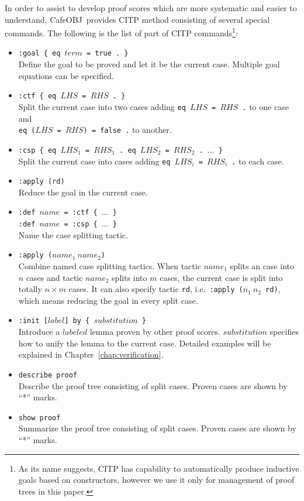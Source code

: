 \documentclass[12pt]{report}
\newcommand{\stt}[1]{{\small{\tt {#1}}}}
\newcommand{\cafeobj}{{\sf CafeOBJ}~}
\begin{document}
In order to assist to develop proof scores which are more systematic
and easier to understand, \cafeobj provides CITP method consisting of
several special commands. The following is the list of part of CITP
commands\footnote{As its name suggests, CITP has capability to
  automatically produce inductive goals based on constructors, however
  we use it only for management of proof trees in this paper.}:
\begin{itemize}
\item \stt{:goal \{ eq $term$ = true . \}}\\ Define the goal to be
  proved and let it be the current case. Multiple goal equations
  can be specified.
\item \stt{:ctf \{ eq $LHS$ = $RHS$ . \}}\\
  Split the current case into two cases adding \stt{eq~$LHS$~=~$RHS$~.} to one case and\\
  \stt{eq~($LHS$~=~$RHS$)~=~false~.} to another.
\item \stt{:csp \{ eq $LH\mathit{S_1}$ = $RH\mathit{S_1}$ . eq $\mathit{LHS_2}$ = $\mathit{RHS_2}$ . $\dots$ \}}\\
  Split the current case into cases adding 
  \stt{eq~$\mathit{LHS_i}$~=~$\mathit{RHS_i}$~.} to each case.
\item \stt{:apply (rd)}\\
 Reduce the goal in the current case.
\item \stt{:def $name$ = :ctf \{ $\dots$ \}}\\
  \stt{:def $name$ = :csp \{ $\dots$ \}}\\
  Name the case splitting tactic.
\item \stt{:apply ($name_1\ name_2$)}\\ 
  Combine named case splitting tactics. When tactic $name_1$ splits an case into
  $n$ cases and tactic $name_2$ splits into $m$ cases, the current case is
  split into totally $n\times m$ cases.  It can also specify tactic
  {\tt rd}, i.e.\ \stt{:apply~($n_1\ n_2$~rd)}, which means reducing
  the goal in every split case.
\item \stt{:init [$label$] by \{ $substitution$ \}}\\
  Introduce a $labeled$ lemma proven by other proof scores. $substitution$ specifies
  how to unify the lemma to the current case. Detailed examples will be explained
  in Chapter~\ref{chap:verification}.
\item \stt{describe proof}\\
 Describe the proof tree consisting of split cases. Proven cases are shown by ``*'' marks.
\item \stt{show proof}\\
Summarize the proof tree consisting of split cases. Proven cases are shown by ``*'' marks.
\end{itemize}
\end{document}

